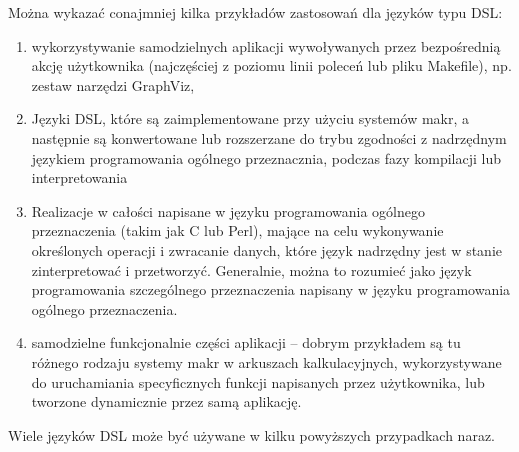 \documentclass[a4paper,12pt,oneside]{report}
\begin{document}
Można wykazać conajmniej kilka przykładów zastosowań dla języków typu DSL:
\begin{enumerate}
  \item wykorzystywanie samodzielnych aplikacji wywoływanych przez bezpośrednią akcję użytkownika (najczęściej z poziomu linii poleceń lub pliku Makefile), np. zestaw narzędzi GraphViz,
  \item Języki DSL, które są zaimplementowane przy użyciu systemów makr, a następnie są konwertowane lub rozszerzane do trybu zgodności z nadrzędnym językiem programowania ogólnego przeznacznia, podczas fazy kompilacji lub interpretowania
  \item Realizacje w całości napisane w języku programowania ogólnego przeznaczenia (takim jak C lub Perl), mające na celu wykonywanie określonych operacji i zwracanie danych, które język nadrzędny jest w stanie zinterpretować i przetworzyć. Generalnie, można to rozumieć jako język programowania szczególnego przeznaczenia napisany w języku programowania ogólnego przeznaczenia.
  \item samodzielne funkcjonalnie części aplikacji -- dobrym przykładem są tu różnego rodzaju systemy makr w arkuszach kalkulacyjnych, wykorzystywane do uruchamiania specyficznych funkcji napisanych przez użytkownika, lub tworzone dynamicznie przez samą aplikację.
\end{enumerate}

Wiele języków DSL może być używane w kilku powyższych przypadkach naraz.
\end{document}
